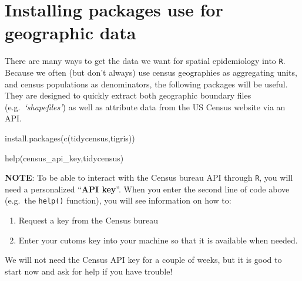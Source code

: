 \documentclass[
]{book}
\newenvironment{Shaded}{\begin{snugshade}}{\end{snugshade}}
\newcommand{\FunctionTok}[1]{\textcolor[rgb]{0.00,0.00,0.00}{#1}}
\newcommand{\NormalTok}[1]{#1}
\newcommand{\StringTok}[1]{\textcolor[rgb]{0.31,0.60,0.02}{#1}}
\providecommand{\tightlist}{%
  \setlength{\itemsep}{0pt}\setlength{\parskip}{0pt}}
\newenvironment{rmdtip}[1]
  {
  \begin{itemize}
  \renewcommand{\labelitemi}{
    \raisebox{-.7\height}[0pt][0pt]{
      {\setkeys{Gin}{width=3em,keepaspectratio}\texttt{[image: images/\#1]}}
    }
  }
  \setlength{\fboxsep}{1em}
  \begin{tip}
  \item
  }
  {
  \end{tip}
  \end{itemize}
  }
\begin{document}
\hypertarget{installing-packages-use-for-geographic-data}{%
\section*{Installing packages use for geographic data}\label{installing-packages-use-for-geographic-data}}

There are many ways to get the data we want for spatial epidemiology into \texttt{R}. Because we often (but don't always) use census geographies as aggregating units, and census populations as denominators, the following packages will be useful. They are designed to quickly extract both geographic boundary files (e.g.~\emph{`shapefiles'}) as well as attribute data from the US Census website via an API.

\begin{Shaded}
\begin{Highlighting}[]
\FunctionTok{install.packages}\NormalTok{(}\FunctionTok{c}\NormalTok{(}\StringTok{\textquotesingle{}tidycensus\textquotesingle{}}\NormalTok{,}\StringTok{\textquotesingle{}tigris\textquotesingle{}}\NormalTok{)) }

\FunctionTok{help}\NormalTok{(}\StringTok{\textquotesingle{}census\_api\_key\textquotesingle{}}\NormalTok{,}\StringTok{\textquotesingle{}tidycensus\textquotesingle{}}\NormalTok{)}
\end{Highlighting}
\end{Shaded}

\begin{rmdtip}{tip}
\textbf{NOTE}: To be able to interact with the Census bureau API through \texttt{R}, you will need a personalized ``\textbf{API key}''. When you enter the second line of code above (e.g.~the \texttt{help()} function), you will see information on how to:

\begin{enumerate}
\def\labelenumi{\arabic{enumi}.}
\tightlist
\item
  Request a key from the Census bureau
\item
  Enter your cutoms key into your machine so that it is available when needed.
\end{enumerate}

We will not need the Census API key for a couple of weeks, but it is good to start now and ask for help if you have trouble!

\end{rmdtip}
\end{document}
